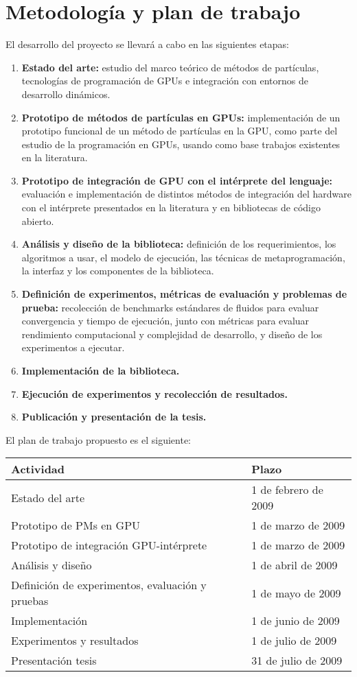 \documentclass[11pt,spanish]{article}
\newcommand{\tnhl}{\tabularnewline\hline}
\begin{document}
\section{Metodología y plan de trabajo}
El desarrollo del proyecto se llevará a cabo en las siguientes etapas:
\begin{enumerate}
    \item \textbf{Estado del arte:}
        estudio del marco teórico de métodos de partículas, tecnologías de
        programación de GPUs e integración con entornos de desarrollo dinámicos.
    \item \textbf{Prototipo de métodos de partículas en GPUs:}
        implementación de un prototipo funcional de un método de partículas en
        la GPU, como parte del estudio de la programación en GPUs, usando como
        base trabajos existentes en la literatura.
    \item \textbf{Prototipo de integración de GPU con el intérprete del lenguaje:}
        evaluación e implementación de distintos métodos de integración del
        hardware con el intérprete presentados en la literatura y en bibliotecas
        de código abierto.
    \item \textbf{Análisis y diseño de la biblioteca:}
        definición de los requerimientos, los algoritmos a usar, el modelo de
        ejecución, las técnicas de metaprogramación, la interfaz y los
        componentes de la biblioteca.
    \item \textbf{Definición de experimentos, métricas de evaluación y problemas de prueba:}
        recolección de benchmarks estándares de fluidos para evaluar convergencia y
        tiempo de ejecución, junto con métricas para evaluar rendimiento computacional y
        complejidad de desarrollo, y diseño de los experimentos a ejecutar.
    \item \textbf{Implementación de la biblioteca.}
    \item \textbf{Ejecución de experimentos y recolección de resultados.}
    \item \textbf{Publicación y presentación de la tesis.}
\end{enumerate}

El plan de trabajo propuesto es el siguiente:

\begin{tabular}{|%
    >{\raggedright\hspace{0pt}} p{} |%
    >{\raggedright\hspace{0pt}} p{} |%
}\hline
    \textbf{Actividad} & \textbf{Plazo}\tnhl
    Estado del arte           & 1 de febrero de 2009 \tnhl
    Prototipo de PMs en GPU   & 1 de marzo de 2009 \tnhl
    Prototipo de integración
    GPU-intérprete            & 1 de marzo de 2009 \tnhl
    Análisis y diseño         & 1 de abril de 2009 \tnhl
    Definición de experimentos, evaluación
    y pruebas                 & 1 de mayo de 2009 \tnhl
    Implementación            & 1 de junio de 2009 \tnhl
    Experimentos y resultados & 1 de julio de 2009 \tnhl
    Presentación tesis        & 31 de julio de 2009 \tnhl
\end{tabular}
\end{document}
